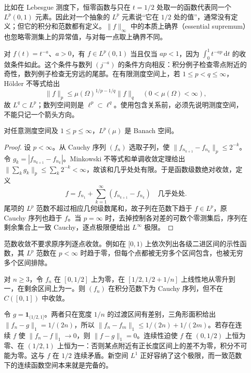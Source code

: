 \documentclass[UTF8,12pt,a4paper,fontset=fandol]{ctexbook}
\begin{document}
比如在 Lebesgue 测度下，恒零函数与只在 $t=1/2$ 处取一的函数代表同一个 $L^p(0,1)$ 元素。因此对一个抽象的 $L^p$ 元素说“它在 $1/2$ 处的值”，通常没有定义；但它的积分和范数都有定义。$\|f\|_\infty$ 中的本质上确界（essential supremum）也忽略零测集上的异常值，与对每一点取上确界不同。

对 $f(t)=t^{-a}$、$a>0$，有 $f\in L^p(0,1)$ 当且仅当 $ap<1$，因为 $\int_0^1t^{-ap}\,\mathrm dt$ 的收敛条件如此。这个条件与数列 $(j^{-a})$ 的条件方向相反：积分例子检查零点附近的奇性，数列例子检查无穷远的尾部。在有限测度空间上，若 $1\leq p<q\leq\infty$，Hölder 不等式给出
\[
 \|f\|_p\leq\mu(\Omega)^{1/p-1/q}\|f\|_q
 \quad(0<\mu(\Omega)<\infty),
\]
故 $L^q\subset L^p$；数列空间则是 $\ell^p\subset\ell^q$。使用包含关系前，必须先说明测度空间，不能只记一个箭头方向。

\begin{theorem}\label{thm:fa-lp-complete}
对任意测度空间及 $1\leq p\leq\infty$，$L^p(\mu)$ 是 Banach 空间。
\end{theorem}
\begin{proof}
设 $p<\infty$。从 Cauchy 序列 $(f_n)$ 选取子列，使 $\|f_{n_{k+1}}-f_{n_k}\|_p\leq2^{-k}$。令 $g_k=|f_{n_{k+1}}-f_{n_k}|$。Minkowski 不等式和单调收敛定理给出 $\|\sum_kg_k\|_p\leq\sum_k2^{-k}<\infty$，故该和几乎处处有限。于是函数级数绝对收敛，定义
\[
 f=f_{n_1}+\sum_{k=1}^{\infty}(f_{n_{k+1}}-f_{n_k})
 \quad\text{几乎处处}.
\]
尾项的 $L^p$ 范数不超过相应几何级数尾和，故子列在范数下趋于 $f\in L^p$，原 Cauchy 序列也趋于 $f$。当 $p=\infty$ 时，去掉控制各对差的可数个零测集后，序列在剩余集合上一致 Cauchy，逐点极限便给出 $L^\infty$ 极限。
\end{proof}
范数收敛不要求原序列逐点收敛。例如在 $[0,1)$ 上依次列出各级二进区间的示性函数，其 $L^p$ 范数在 $p<\infty$ 时趋于零，但每个点都被无穷多个区间包含，也被无穷多个区间排除。

\begin{example}[为什么要从连续函数走向可积函数]\label{ex:fa-incomplete-integral}
对 $n\geq3$，令 $f_n$ 在 $[0,1/2]$ 上为零，在 $[1/2,1/2+1/n]$ 上线性地从零升到一，在剩余区间上为一。则 $(f_n)$ 在积分范数下为 Cauchy 序列，但不在 $C([0,1])$ 中收敛。
\end{example}
\begin{solve}
令 $g=\mathbf1_{(1/2,1]}$。两者只在宽度 $1/n$ 的过渡区间有差别，三角形面积给出 $\|f_n-g\|_1=1/(2n)$，所以 $\|f_n-f_m\|_1\leq1/(2n)+1/(2m)$。若存在连续 $f$ 使 $\|f_n-f\|_1\to0$，则 $\|f-g\|_1=0$。连续性迫使 $f$ 在 $(0,1/2)$ 上恒为零、在 $(1/2,1)$ 上恒为一：否则某点附近有正长度区间上的差不为零，积分不可能为零。这与 $f$ 在 $1/2$ 连续矛盾。新空间 $L^1$ 正好容纳了这个极限，而一致范数下的连续函数空间本来就是完备的。
\end{solve}
\end{document}
